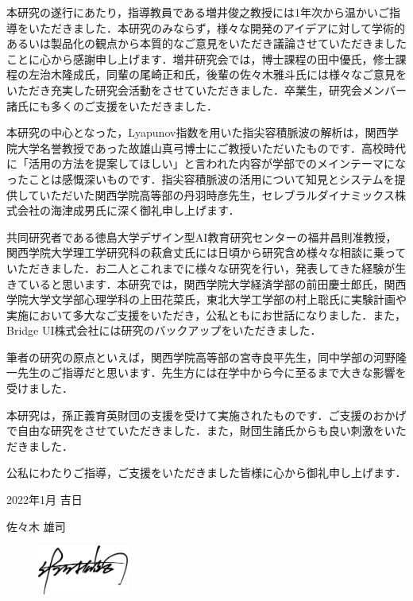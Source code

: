 \begin{acknowledgment}

本研究の遂行にあたり，指導教員である増井俊之教授には1年次から温かいご指導をいただきました．本研究のみならず，様々な開発のアイデアに対して学術的あるいは製品化の観点から本質的なご意見をいただき議論させていただきましたことに心から感謝申し上げます．増井研究会では，博士課程の田中優氏，修士課程の左治木隆成氏，同輩の尾崎正和氏，後輩の佐々木雅斗氏には様々なご意見をいただき充実した研究会活動をさせていただきました．卒業生，研究会メンバー諸氏にも多くのご支援をいただきました．

本研究の中心となった，Lyapunov指数を用いた指尖容積脈波の解析は，関西学院大学名誉教授であった故雄山真弓博士にご教授いただいたものです．高校時代に「活用の方法を提案してほしい」と言われた内容が学部でのメインテーマになったことは感慨深いものです．指尖容積脈波の活用について知見とシステムを提供していただいた関西学院高等部の丹羽時彦先生，セレブラルダイナミックス株式会社の海津成男氏に深く御礼申し上げます．

共同研究者である徳島大学デザイン型AI教育研究センターの福井昌則准教授，関西学院大学理工学研究科の萩倉丈氏には日頃から研究含め様々な相談に乗っていただきました．お二人とこれまでに様々な研究を行い，発表してきた経験が生きていると思います．本研究では，関西学院大学経済学部の前田慶士郎氏，関西学院大学文学部心理学科の上田花菜氏，東北大学工学部の村上聡氏に実験計画や実施において多大なご支援をいただき，公私ともにお世話になりました．また，Bridge UI株式会社には研究のバックアップをいただきました．

筆者の研究の原点といえば，関西学院高等部の宮寺良平先生，同中学部の河野隆一先生のご指導だと思います．先生方には在学中から今に至るまで大きな影響を受けました．

本研究は，孫正義育英財団の支援を受けて実施されたものです．ご支援のおかげで自由な研究をさせていただきました．また，財団生諸氏からも良い刺激をいただきました．

公私にわたりご指導，ご支援をいただきました皆様に心から御礼申し上げます．

\begin{flushright}
2022年1月 吉日

佐々木 雄司
\end{flushright}

\begin{figure}[htbp]
    \begin{flushright}
       \includegraphics[width=30mm]{img/signature.jpeg}
    \end{flushright}
\end{figure}

\end{acknowledgment}
